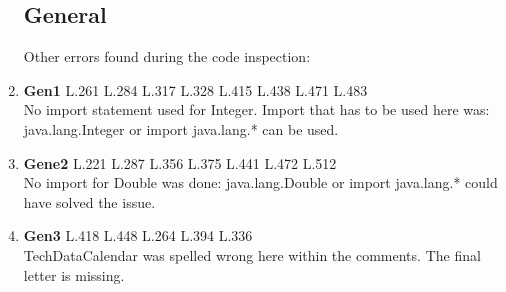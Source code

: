 \begin{enumerate}
\subsection{General}
Other errors found during the code inspection:

	\item \textbf{Gen1} L.261 L.284 L.317 L.328 L.415 L.438 L.471 L.483 \\ No import statement used for Integer. Import that has to be used here was: java.lang.Integer or import java.lang.* can be used.
	\item \textbf{Gene2} L.221 L.287 L.356 L.375 L.441 L.472 L.512 \\ No import for Double was done: java.lang.Double or import java.lang.* could have solved the issue.
	\item \textbf{Gen3} L.418 L.448 L.264 L.394 L.336 \\ TechDataCalendar was spelled wrong here within the comments. The final letter is missing.
\end{enumerate}
